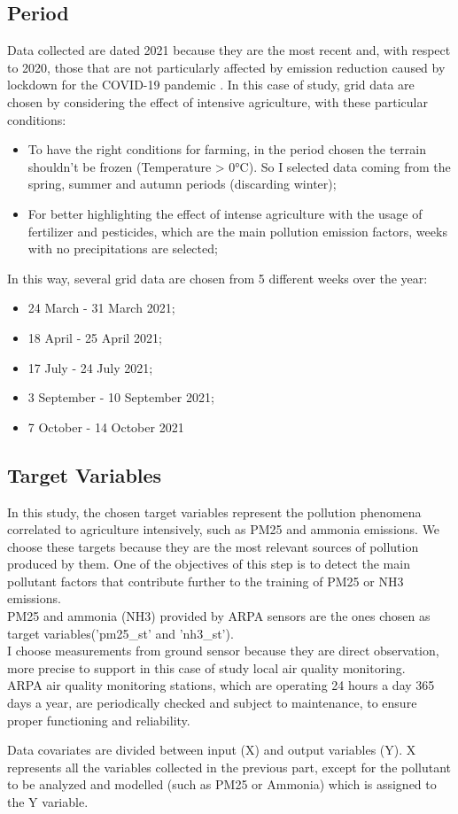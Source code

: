 \subsection{Period}  
Data collected are dated 2021 because they are the most recent and, with respect to 2020, those that are not particularly affected by emission reduction caused by lockdown for the COVID-19 pandemic \cite{bontempi2022analysis}. 
\pagebreak
In this case of study, grid data are chosen by considering the effect of intensive agriculture, with these particular conditions:
    \begin{itemize}
        \item To have the right conditions for farming, in the period chosen the terrain shouldn't be frozen (Temperature > 0°C). So I selected data coming from the spring, summer and autumn periods (discarding winter);
        \item For better highlighting the effect of intense agriculture with the usage of fertilizer and pesticides, which are the main pollution emission factors, weeks with no precipitations are selected;
\end{itemize}
In this way, several grid data are chosen from 5 different weeks over the year:
\begin{itemize}
    \item 24 March - 31 March 2021;
    \item 18 April - 25 April 2021;
    \item 17 July - 24 July 2021;
    \item 3 September - 10 September 2021;
    \item 7 October - 14 October 2021
\end{itemize}

\subsection{Target Variables}
In this study, the chosen target variables represent the pollution phenomena correlated to agriculture intensively, such as PM25 and ammonia emissions. We choose these targets because they are the most relevant sources of pollution produced by them.\newline
One of the objectives of this step is to detect the main pollutant factors that contribute further to the training of PM25 or NH3 emissions.\\
PM25 and ammonia (NH3) provided by ARPA sensors are the ones chosen as target variables('pm25\_st' and 'nh3\_st').\\
I choose measurements from ground sensor because they are direct observation, more precise to support in this case of study local air quality monitoring. \\
ARPA air quality monitoring stations, which are operating 24 hours a day 365 days a year, are periodically checked and subject to maintenance, to ensure proper functioning and reliability.\par
Data covariates are divided between input (X) and output variables (Y). X represents all the variables collected in the previous part, except for the pollutant to be analyzed and modelled (such as PM25 or Ammonia) which is assigned to the Y variable.

